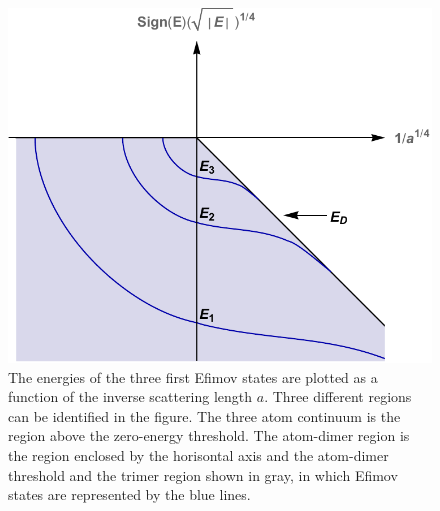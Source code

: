 \begin{figure}
	\centering
	\includegraphics[width=0.75\linewidth]{efimov}
	\caption{The energies of the three first Efimov states are plotted as a function of the inverse scattering length $a$. Three different regions can be identified in the figure. The three atom continuum is the region above the zero-energy threshold. The atom-dimer region is the region enclosed by the horisontal axis and the atom-dimer threshold and the trimer region shown in gray, in which Efimov states are represented by the blue lines.\cite{Kajsa_my}}\label{fig:efimov}
\end{figure} 
